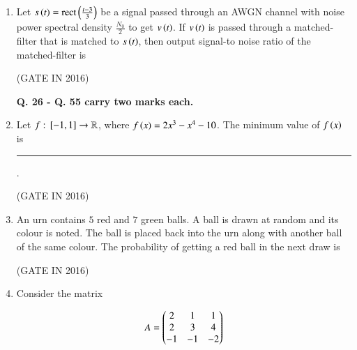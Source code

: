 \documentclass[journal,12pt,onecolumn]{IEEEtran}
\theoremstyle{remark}
\begin{document}
\begin{enumerate}
\item Let $s\left(t\right) = \text{rect}\left(\frac{t-3}{3}\right)$ be a signal passed through an AWGN  channel with noise power spectral density  $\frac{N_0}{2}$ to get $v\left(t\right)$. If $v\left(t\right)$ is passed through a matched-filter that is matched to $s\left(t\right)$, then output signal-to noise ratio  of the matched-filter is

\hfill{(GATE IN 2016)}
\begin{enumerate}
\end{enumerate}

\textbf{Q. 26 - Q. 55 carry two marks each. }

\item Let $f: {}\left[-1,1\right]\to \mathbb{R}$, where $f\left(x\right) = 2x^3 - x^4 - 10$. The minimum value of $f\left(x\right)$ is \rule{2cm}{0.4pt}.

\hfill{(GATE IN 2016)}

\item An urn contains $5$ red and $7$ green balls. A ball is drawn at random and its colour is noted. The ball is placed back into the urn along with another ball of the same colour. The probability of getting a red ball in the next draw is

\hfill{(GATE IN 2016)}
\begin{enumerate}
\end{enumerate}

\item Consider the matrix

\begin{align}
A = \begin{pmatrix}2 & 1 & 1 \\ 2 & 3 & 4 \\ -1 & -1 & -2\end{pmatrix}
\end{align}


\end{enumerate}
\end{document}

